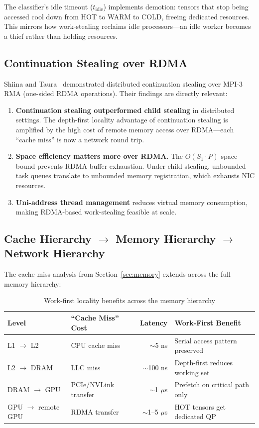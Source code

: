 \documentclass[11pt,letterpaper]{article}
\begin{document}
The classifier's idle timeout ($t_\text{idle}$) implements demotion: tensors that stop being accessed cool down from HOT to WARM to COLD, freeing dedicated resources. This mirrors how work-stealing reclaims idle processors---an idle worker becomes a thief rather than holding resources.

\subsection{Continuation Stealing over RDMA}

Shiina and Taura~\cite{shiina2022continuation} demonstrated distributed continuation stealing over MPI-3 RMA (one-sided RDMA operations). Their findings are directly relevant:

\begin{enumerate}
    \item \textbf{Continuation stealing outperformed child stealing} in distributed settings. The depth-first locality advantage of continuation stealing is amplified by the high cost of remote memory access over RDMA---each ``cache miss'' is now a network round trip.
    \item \textbf{Space efficiency matters more over RDMA}. The $O(S_1 \cdot P)$ space bound prevents RDMA buffer exhaustion. Under child stealing, unbounded task queues translate to unbounded memory registration, which exhausts NIC resources.
    \item \textbf{Uni-address thread management} reduces virtual memory consumption, making RDMA-based work-stealing feasible at scale.
\end{enumerate}

\subsection{Cache Hierarchy $\to$ Memory Hierarchy $\to$ Network Hierarchy}

The cache miss analysis from Section~\ref{sec:memory} extends across the full memory hierarchy:

\begin{table}[htbp]
\centering
\caption{Work-first locality benefits across the memory hierarchy}
\label{tab:hierarchy}
\begin{tabular}{@{}llrl@{}}
\toprule
\textbf{Level} & \textbf{``Cache Miss'' Cost} & \textbf{Latency} & \textbf{Work-First Benefit} \\
\midrule
L1 $\to$ L2 & CPU cache miss & $\sim$5 ns & Serial access pattern preserved \\
L2 $\to$ DRAM & LLC miss & $\sim$100 ns & Depth-first reduces working set \\
DRAM $\to$ GPU & PCIe/NVLink transfer & $\sim$1 $\mu$s & Prefetch on critical path only \\
GPU $\to$ remote GPU & RDMA transfer & $\sim$1--5 $\mu$s & HOT tensors get dedicated QP \\
\bottomrule
\end{tabular}
\end{table}
\end{document}
